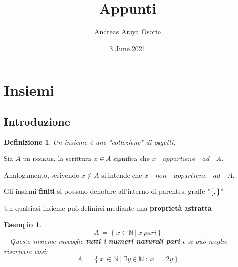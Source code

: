 \documentclass[12pt, a4paper]{article}
\title{Appunti}
\author{Andreas Araya Osorio}
\date{3 June 2021}
\theoremstyle{break}
\newtheorem{defn}{Definizione}
\theoremstyle{lemma}
\theoremstyle{lemma}
\theoremstyle{lemma}
\newtheorem{esem}{Esempio}
\begin{document}
\maketitle
\section{Insiemi}

\subsection{Introduzione}

\begin{defn}
	Un insieme è una "collezione" di oggetti.
\end{defn}

Sia $A$ un \textsc{insieme}, la scrittura $ x \in A $ significa che $x \quad
appartiene \quad ad \quad A$.

Analogamento, scrivendo $ x \notin A $ si intende che $ x \quad non \quad appartiene \quad ad \quad A$.

Gli insiemi \textbf{finiti} si possono denotare all'interno di parentesi graffe $ " \{ , \} " $

Un qualsiasi insieme può definirsi mediante una \textbf{proprietà astratta}

\begin{esem}
	\begin{equation}
	A\ =\ \{\ x \in \mathbb{N}\ |\ x\ pari\ \}
	\end{equation} 
	Questo insieme raccoglie \textbf{tutti i numeri naturali pari} e si può meglio riscrivere così:
	\begin{equation}
	A\ =\ \{\ x\ \in \mathbb{N}\ |\ \exists y \in \mathbb{N}\ :\ x\ =\ 2y\ \}
	\end{equation}
\end{esem}
\end{document}
